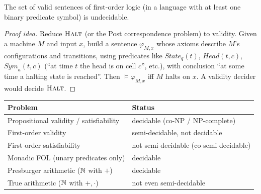\begin{theorem}
The set of valid sentences of first-order logic (in a language with at least one binary
predicate symbol) is undecidable.
\end{theorem}
\begin{proof}[Proof idea]
Reduce $\textsc{Halt}$ (or the Post correspondence problem) to validity. Given a machine $M$
and input $x$, build a sentence $\varphi_{M,x}$ whose axioms describe $M$'s configurations
and transitions, using predicates like $\mathit{State}_q(t)$, $\mathit{Head}(t,c)$,
$\mathit{Sym}_a(t,c)$ (``at time $t$ the head is on cell $c$'', etc.), with conclusion
``at some time a halting state is reached''. Then $\models\varphi_{M,x}$ iff $M$ halts on
$x$. A validity decider would decide $\textsc{Halt}$.
\end{proof}

\begin{important}
\begin{center}
\begin{tabular}{ll}
\toprule
Problem & Status\\
\midrule
Propositional validity / satisfiability & decidable (co-NP / NP-complete)\\
First-order validity & semi-decidable, not decidable\\
First-order satisfiability & not semi-decidable (co-semi-decidable)\\
Monadic FOL (unary predicates only) & decidable\\
Presburger arithmetic ($\mathbb{N}$ with $+$) & decidable\\
True arithmetic ($\mathbb{N}$ with $+,\cdot$) & not even semi-decidable\\
\bottomrule
\end{tabular}
\end{center}
\end{important}

\begin{center}
\end{center}

